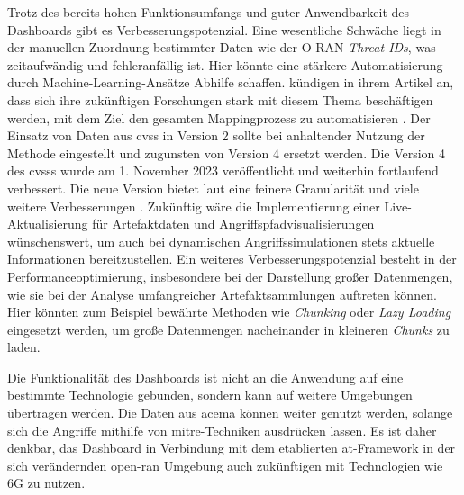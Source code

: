 Trotz des bereits hohen Funktionsumfangs und guter Anwendbarkeit des Dashboards gibt es Verbesserungspotenzial. Eine wesentliche Schwäche liegt in der manuellen Zuordnung bestimmter Daten wie der O-RAN \textit{Threat-IDs}, was zeitaufwändig und fehleranfällig ist. Hier könnte eine stärkere Automatisierung durch Machine-Learning-Ansätze Abhilfe schaffen. \citeauthor{klementSecuring6GTransition2024} kündigen in ihrem Artikel an, dass sich ihre zukünftigen Forschungen stark mit diesem Thema beschäftigen werden, mit dem Ziel den gesamten Mappingprozess zu automatisieren \autocite{klementSecuring6GTransition2024}. Der Einsatz von Daten aus \gls{cvss} in Version 2 sollte bei anhaltender Nutzung der Methode eingestellt und zugunsten von Version 4 ersetzt werden. Die Version 4 des \gls{cvss}s wurde am 1. November 2023 veröffentlicht und weiterhin fortlaufend verbessert. Die neue Version bietet laut \citeauthor{dugalAnnouncingCVSSV40} eine feinere Granularität und viele weitere Verbesserungen \autocite{dugalAnnouncingCVSSV40}. Zukünftig wäre die Implementierung einer Live-Aktualisierung für Artefaktdaten und Angriffspfadvisualisierungen wünschenswert, um auch bei dynamischen Angriffssimulationen stets aktuelle Informationen bereitzustellen. Ein weiteres Verbesserungspotenzial besteht in der Performanceoptimierung, insbesondere bei der Darstellung großer Datenmengen, wie sie bei der Analyse umfangreicher Artefaktsammlungen auftreten können. Hier könnten zum Beispiel bewährte Methoden wie \textit{Chunking} oder \textit{Lazy Loading} eingesetzt werden, um große Datenmengen nacheinander in kleineren \textit{Chunks} zu laden.
\par Die Funktionalität des Dashboards ist nicht an die Anwendung auf eine bestimmte Technologie gebunden, sondern kann auf weitere Umgebungen übertragen werden. Die Daten aus \gls{acema} können weiter genutzt werden, solange sich die Angriffe mithilfe von \gls{mitre}-Techniken ausdrücken lassen. Es ist daher denkbar, das Dashboard in Verbindung mit dem etablierten \gls{at}-Framework in der sich verändernden \gls{open-ran} Umgebung auch zukünftigen mit Technologien wie 6G zu nutzen.
